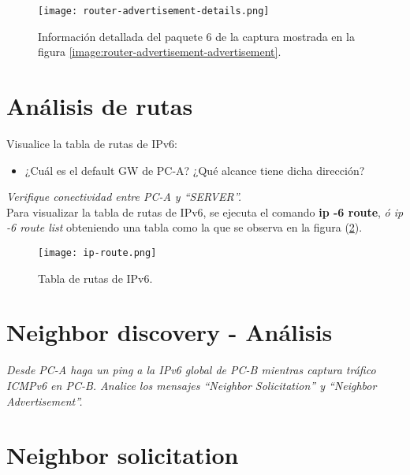 \documentclass[osajnl,twocolumn,showpacs,superscriptaddress,10pt]{revtex4-1} %
\begin{document}
\begin{figure}[H]
    \centering
    \texttt{[image: router-advertisement-details.png]}
    \caption{Información detallada del paquete 6 de la captura mostrada en la figura \ref{image:router-advertisement-advertisement}.}
    \label{image:router-advertisement-details}
\end{figure}

\section{Análisis de rutas}

Visualice la tabla de rutas de IPv6:

\begin{itemize}
    \item ¿Cuál es el default GW de PC-A? ¿Qué alcance tiene dicha dirección?
\end{itemize}

\textit{Verifique conectividad entre PC-A y “SERVER”.} \\

Para visualizar la tabla de rutas de IPv6, se ejecuta el comando \textbf{ip -6 route}, \textit{ó ip -6 route list} obteniendo
una tabla como la que se observa en la figura (\ref{image:ip-route}).

\begin{figure}[H]
    \centering
    \texttt{[image: ip-route.png]}
    \caption{Tabla de rutas de IPv6.}
    \label{image:ip-route}
\end{figure}

\section{Neighbor discovery - Análisis}

\textit{Desde PC-A haga un ping a la IPv6 global de PC-B mientras captura tráfico ICMPv6 en
PC-B. Analice los mensajes “Neighbor Solicitation” y “Neighbor Advertisement”.} \\


\section{Neighbor solicitation}
\end{document}
